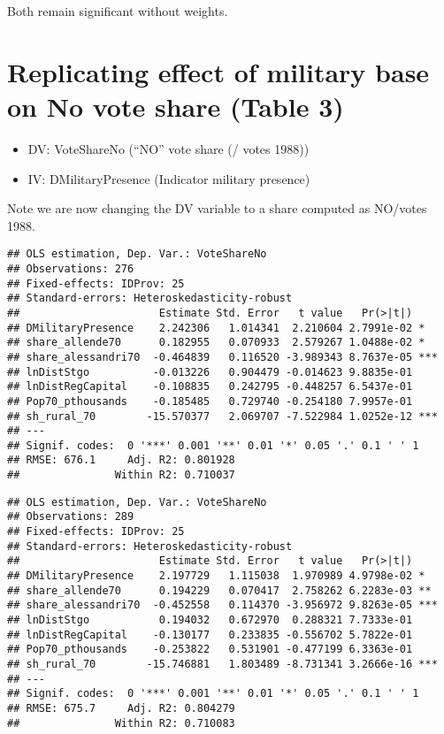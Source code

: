 \documentclass[
]{article}
\providecommand{\tightlist}{%
  \setlength{\itemsep}{0pt}\setlength{\parskip}{0pt}}
\begin{document}
Both remain significant without weights.

\hypertarget{replicating-effect-of-military-base-on-no-vote-share-table-3-1}{%
\section{Replicating effect of military base on No vote share (Table
3)}\label{replicating-effect-of-military-base-on-no-vote-share-table-3-1}}

\begin{itemize}
\tightlist
\item
  DV: VoteShareNo (``NO'' vote share (/ votes 1988))
\item
  IV: DMilitaryPresence (Indicator military presence)
\end{itemize}

Note we are now changing the DV variable to a share computed as NO/votes
1988.

\begin{verbatim}
## OLS estimation, Dep. Var.: VoteShareNo
## Observations: 276 
## Fixed-effects: IDProv: 25
## Standard-errors: Heteroskedasticity-robust 
##                      Estimate Std. Error   t value   Pr(>|t|)    
## DMilitaryPresence    2.242306   1.014341  2.210604 2.7991e-02 *  
## share_allende70      0.182955   0.070933  2.579267 1.0488e-02 *  
## share_alessandri70  -0.464839   0.116520 -3.989343 8.7637e-05 ***
## lnDistStgo          -0.013226   0.904479 -0.014623 9.8835e-01    
## lnDistRegCapital    -0.108835   0.242795 -0.448257 6.5437e-01    
## Pop70_pthousands    -0.185485   0.729740 -0.254180 7.9957e-01    
## sh_rural_70        -15.570377   2.069707 -7.522984 1.0252e-12 ***
## ---
## Signif. codes:  0 '***' 0.001 '**' 0.01 '*' 0.05 '.' 0.1 ' ' 1
## RMSE: 676.1     Adj. R2: 0.801928
##               Within R2: 0.710037
\end{verbatim}

\begin{verbatim}
## OLS estimation, Dep. Var.: VoteShareNo
## Observations: 289 
## Fixed-effects: IDProv: 25
## Standard-errors: Heteroskedasticity-robust 
##                      Estimate Std. Error   t value   Pr(>|t|)    
## DMilitaryPresence    2.197729   1.115038  1.970989 4.9798e-02 *  
## share_allende70      0.194229   0.070417  2.758262 6.2283e-03 ** 
## share_alessandri70  -0.452558   0.114370 -3.956972 9.8263e-05 ***
## lnDistStgo           0.194032   0.672970  0.288321 7.7333e-01    
## lnDistRegCapital    -0.130177   0.233835 -0.556702 5.7822e-01    
## Pop70_pthousands    -0.253822   0.531901 -0.477199 6.3363e-01    
## sh_rural_70        -15.746881   1.803489 -8.731341 3.2666e-16 ***
## ---
## Signif. codes:  0 '***' 0.001 '**' 0.01 '*' 0.05 '.' 0.1 ' ' 1
## RMSE: 675.7     Adj. R2: 0.804279
##               Within R2: 0.710083
\end{verbatim}
\end{document}
